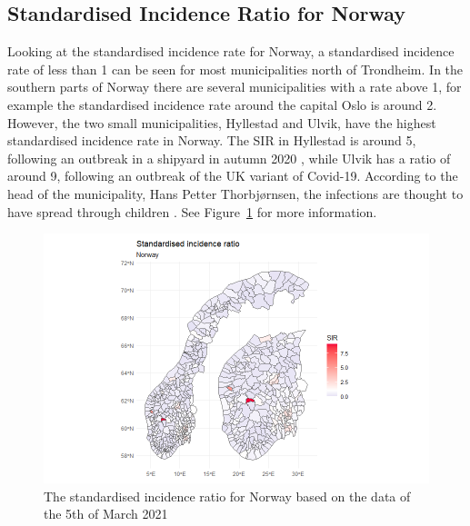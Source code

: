 \subsection{Standardised Incidence Ratio for Norway}
Looking at the standardised incidence rate for Norway, a standardised incidence rate of less than 1 can be seen for most municipalities north of Trondheim. In the southern parts of Norway there are several municipalities with a rate above 1, for example the standardised incidence rate around the capital Oslo is around 2. However, the two small municipalities, Hyllestad and Ulvik, have the highest standardised incidence rate in Norway. The SIR in Hyllestad is around 5, following an outbreak in a shipyard in autumn 2020 \cite{newspaper1}, while Ulvik has a ratio of around 9, following an outbreak of the UK variant of Covid-19. According to the head of the municipality, Hans Petter Thorbjørnsen, the infections are thought to have spread through children \cite{newspaper2}. See Figure~\ref{sirnorway} for more information.
%   
\begin{figure}[H]
  \centering
  \includegraphics[width = 1.2\textwidth]{sir_norge.png}
  \caption{The standardised incidence ratio for Norway based on the data of the 5th of March 2021}
  \label{sirnorway}
\end{figure}
\clearpage
